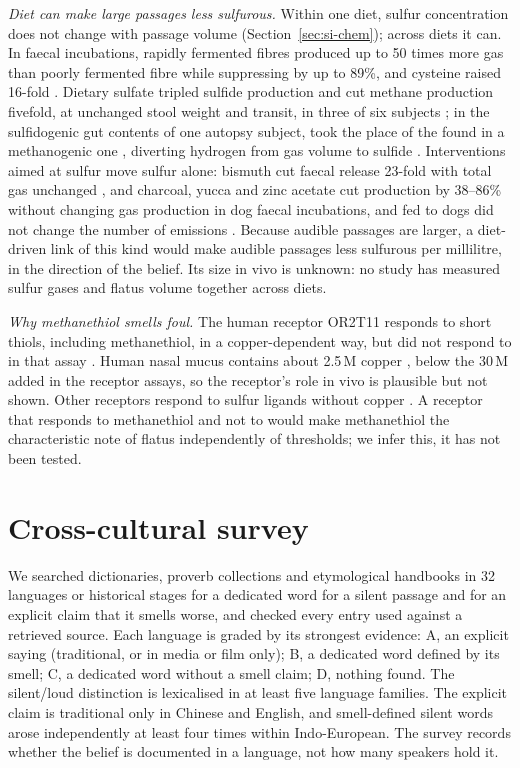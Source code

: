 \documentclass[11pt]{article}
\begin{document}
\emph{Diet can make large passages less sulfurous.} Within one diet, sulfur concentration does not change with passage
volume (Section~\ref{sec:si-chem}); across diets it can. In faecal incubations, rapidly fermented fibres produced up to
50 times more gas than poorly fermented fibre while suppressing  by up to 89\%, and cysteine raised 
16-fold \cite{yao2018}. Dietary sulfate tripled sulfide production and cut methane production fivefold, at unchanged stool
weight and transit, in three of six subjects \cite{christl1992b}; in the sulfidogenic gut contents of one
autopsy subject,  took the place of the  found in a methanogenic one \cite{gibson1993b}, diverting hydrogen from gas volume to sulfide \cite{grimble1989}.
Interventions aimed at sulfur move sulfur alone: bismuth cut faecal  release 23-fold with total gas unchanged
\cite{suarez1998b}, and charcoal, yucca and zinc acetate cut  production by 38--86\% without changing gas
production in dog faecal incubations, and fed to dogs did not change the number of emissions \cite{giffard2001}. Because audible passages are larger, a diet-driven link of
this kind would make audible passages less sulfurous per millilitre, in the direction of the belief. Its size in vivo
is unknown: no study has measured sulfur gases and flatus volume together across diets.

\emph{Why methanethiol smells foul.} The human receptor OR2T11 responds to short thiols, including methanethiol, in a
copper-dependent way, but did not respond to  in that assay \cite{li2016}. Human nasal mucus contains about 2.5\,\textmu M copper
\cite{block2017}, below the 30\,\textmu M added in the receptor assays, so the receptor's role in vivo is plausible
but not shown. Other receptors respond to sulfur ligands without copper \cite{duan2012,haag2019,zhang2018}. A
receptor that responds to methanethiol and not to  would make methanethiol the characteristic note of flatus
independently of thresholds; we infer this, it has not been tested.


\section{Cross-cultural survey}
\label{sec:si-culture}
We searched dictionaries, proverb collections and etymological handbooks in 32 languages or historical stages for a
dedicated word for a silent passage and for an explicit claim that it smells worse, and checked every entry used
against a retrieved source. Each language is graded by its strongest evidence: A, an explicit saying (traditional,
or in media or film only); B, a dedicated word defined by its smell; C, a dedicated word without a smell claim; D,
nothing found. The silent/loud distinction is lexicalised in at least five language families. The explicit claim is
traditional only in Chinese and English, and smell-defined silent words arose independently at least four times
within Indo-European. The survey records whether the belief is documented in a language, not how many speakers hold
it.
\end{document}
